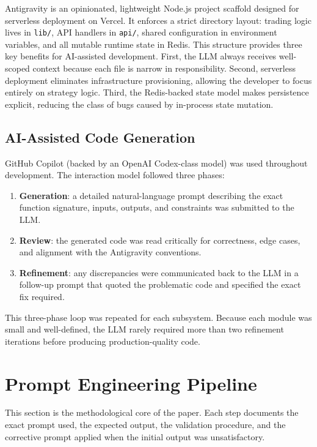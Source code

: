 \documentclass[conference]{IEEEtran}
\begin{document}
Antigravity is an opinionated, lightweight Node.js project scaffold
designed for serverless deployment on Vercel.  It enforces a strict
directory layout: trading logic lives in \texttt{lib/}, API handlers
in \texttt{api/}, shared configuration in environment variables, and
all mutable runtime state in Redis.  This structure provides three
key benefits for AI-assisted development.  First, the LLM always
receives well-scoped context because each file is narrow in
responsibility.  Second, serverless deployment eliminates
infrastructure provisioning, allowing the developer to focus entirely
on strategy logic.  Third, the Redis-backed state model makes
persistence explicit, reducing the class of bugs caused by in-process
state mutation.

\subsection{AI-Assisted Code Generation}

GitHub Copilot (backed by an OpenAI Codex-class model) was used
throughout development.  The interaction model followed three phases:
\begin{enumerate}
  \item \textbf{Generation}: a detailed natural-language prompt
        describing the exact function signature, inputs, outputs, and
        constraints was submitted to the LLM.
  \item \textbf{Review}: the generated code was read critically for
        correctness, edge cases, and alignment with the Antigravity
        conventions.
  \item \textbf{Refinement}: any discrepancies were communicated back
        to the LLM in a follow-up prompt that quoted the problematic
        code and specified the exact fix required.
\end{enumerate}

This three-phase loop was repeated for each subsystem.  Because each
module was small and well-defined, the LLM rarely required more than
two refinement iterations before producing production-quality code.

\section{Prompt Engineering Pipeline}

This section is the methodological core of the paper.  Each step
documents the exact prompt used, the expected output, the validation
procedure, and the corrective prompt applied when the initial output
was unsatisfactory.
\end{document}
